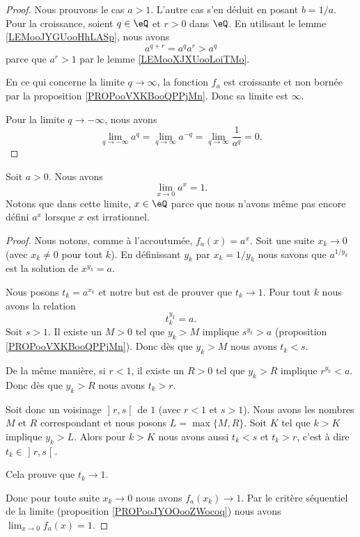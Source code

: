 \begin{proof}
    Nous prouvons le cas \( a>1\). L'autre cas s'en déduit en posant \( b=1/a\). Pour la croissance, soient \( q\in \eQ\) et \( r>0\) dans \( \eQ\). En utilisant le lemme \ref{LEMooJYGUooHhLASp}, nous avons
    \begin{equation}
        a^{q+r}=a^qa^r>a^q
    \end{equation}
    parce que \( a^r>1\) par le lemme \ref{LEMooXJXUooLoiTMo}. 

    En ce qui concerne la limite \( q\to \infty\), la fonction \( f_a\) est croissante et non bornée par la proposition \ref{PROPooVXKBooQPPjMn}. Donc sa limite est \( \infty\).

    Pour la limite \( q\to -\infty\), nous avons
    \begin{equation}
        \lim_{q\to -\infty} a^q=\lim_{q\to \infty} a^{-q}=\lim_{q\to \infty} \frac{1}{ a^q }=0.
    \end{equation}
\end{proof}

\begin{proposition}      \label{PROPooIIDGooTRtlUD}
    Soit \( a>0\). Nous avons
    \begin{equation}
        \lim_{x\to 0} a^x=1.
    \end{equation}
    Notons que dans cette limite, \( x\in \eQ\) parce que nous n'avons même pas encore défini \( a^x\) lorsque \( x\) est irrationnel.
\end{proposition}

\begin{proof}
    Nous notons, comme à l'accoutumée, \( f_a(x)=a^x\). Soit une suite \( x_k\to 0\) (avec \( x_k\neq 0\) pour tout \( k\)). En définissant \( y_k\) par \( x_k=1/y_k\) nous savons que \( a^{1/y_k}\) est la solution de \( x^{y_k}=a\).

    Nous posons \( t_k=a^{x_k}\) et notre but est de prouver que \( t_k\to 1\). Pour tout \( k\) nous avons la relation
    \begin{equation}
        t_k^{y_k}=a.
    \end{equation}
    Soit \( s>1\). Il existe un \( M>0\) tel que \( y_k>M\) implique \( s^{y_k}>a\) (proposition \ref{PROPooVXKBooQPPjMn}). Donc dès que \( y_k>M\) nous avons \( t_k<s\).

    De la même manière, si \( r<1\), il existe un \( R>0\) tel que \( y_k>R\) implique \( r^{y_k}<a\). Donc dès que \( y_k>R\) nous avons \( t_k>r\).

    Soit donc un voisinage \( \mathopen] r , s \mathclose[\) de \( 1\) (avec \( r<1\) et \( s>1\)). Nous avons les nombres \( M\) et \( R\) correspondant et nous posons \( L=\max\{ M,R \}\). Soit \( K\) tel que \( k>K\) implique \( y_k>L\). Alors pour \( k>K\) nous avons aussi \( t_k<s\) et \( t_k>r\), c'est à dire \( t_k\in \mathopen] r , s \mathclose[\).

        Cela prouve que \( t_k\to 1\).

        Donc pour toute suite \( x_k\to 0\) nous avons \( f_a(x_k)\to 1\). Par le critère séquentiel de la limite (proposition \ref{PROPooJYOOooZWocoq}) nous avons \( \lim_{x\to 0} f_a(x)=1\).
\end{proof}

